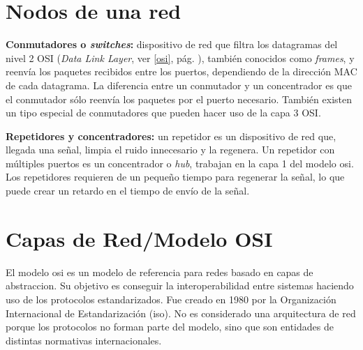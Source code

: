 \documentclass[a4paper, 11pt]{report} %
\begin{document}
\section{Nodos de una red}
\begin{description}
\item \textbf{Conmutadores o \textit{switches}:} dispositivo de red que filtra los datagramas del nivel 2 OSI (\textit{Data Link Layer}, ver \ref{osi}, pág. \pageref{osi}), también conocidos como \textit{frames}, y reenvía los paquetes recibidos entre los puertos, dependiendo de la dirección MAC de cada datagrama. La diferencia entre un conmutador y un concentrador es que el conmutador sólo reenvía los paquetes por el puerto necesario. También existen un tipo especial de conmutadores que pueden hacer uso de la capa 3 OSI.
\item \textbf{Repetidores y concentradores:} un repetidor es un dispositivo de red que, llegada una señal, limpia el ruido innecesario y la regenera. Un repetidor con múltiples puertos es un concentrador o \textit{hub}, trabajan en la capa 1 del modelo \acrshort{osi}. Los repetidores requieren de un pequeño tiempo para regenerar la señal, lo que puede crear un retardo en el tiempo de envío de la señal.
\end{description}

%
\newpage

\section{Capas de Red/Modelo OSI}
El modelo \acrshort{osi} es un modelo de referencia para redes basado en \gls{capas de abstraccion}.
Su objetivo es conseguir la interoperabilidad entre sistemas haciendo uso de los protocolos estandarizados. Fue creado en 1980 por la Organización Internacional de Estandarización (\acrshort{iso}). No es considerado una arquitectura de red porque los protocolos no forman parte del modelo, sino que son entidades de distintas normativas internacionales.
\vspace*{20pt}
\end{document}
